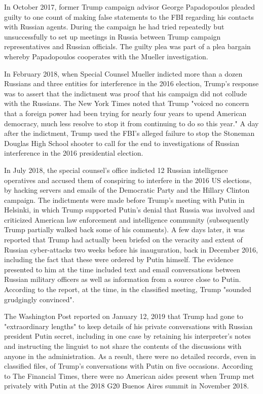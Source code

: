 In October 2017, former Trump campaign advisor George Papadopoulos
pleaded guilty to one count of making false statements to the FBI
regarding his contacts with Russian agents. During the campaign he had
tried repeatedly but unsuccessfully to set up meetings in Russia between
Trump campaign representatives and Russian officials. The guilty plea
was part of a plea bargain whereby Papadopoulos cooperates with the
Mueller investigation.

In February 2018, when Special Counsel Mueller indicted more than a
dozen Russians and three entities for interference in the 2016 election,
Trump's response was to assert that the indictment was proof that his
campaign did not collude with the Russians. The New York Times noted
that Trump "voiced no concern that a foreign power had been trying for
nearly four years to upend American democracy, much less resolve to stop
it from continuing to do so this year." A day after the indictment,
Trump used the FBI's alleged failure to stop the Stoneman Douglas High
School shooter to call for the end to investigations of Russian
interference in the 2016 presidential election.

In July 2018, the special counsel's office indicted 12 Russian
intelligence operatives and accused them of conspiring to interfere in
the 2016 US elections, by hacking servers and emails of the Democratic
Party and the Hillary Clinton campaign. The indictments were made before
Trump's meeting with Putin in Helsinki, in which Trump supported Putin's
denial that Russia was involved and criticized American law enforcement
and intelligence community (subsequently Trump partially walked back
some of his comments). A few days later, it was reported that Trump had
actually been briefed on the veracity and extent of Russian
cyber-attacks two weeks before his inauguration, back in December 2016,
including the fact that these were ordered by Putin himself. The
evidence presented to him at the time included text and email
conversations between Russian military officers as well as information
from a source close to Putin. According to the report, at the time, in
the classified meeting, Trump "sounded grudgingly convinced".

The Washington Post reported on January 12, 2019 that Trump had gone to
"extraordinary lengths" to keep details of his private conversations
with Russian president Putin secret, including in one case by retaining
his interpreter's notes and instructing the linguist to not share the
contents of the discussions with anyone in the administration. As a
result, there were no detailed records, even in classified files, of
Trump's conversations with Putin on five occasions. According to The
Financial Times, there were no American aides present when Trump met
privately with Putin at the 2018 G20 Buenos Aires summit in November
2018.

